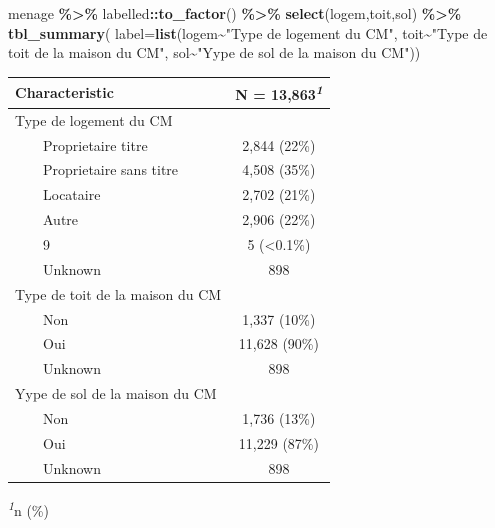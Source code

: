 \documentclass[
]{article}
\newenvironment{Shaded}{\begin{snugshade}}{\end{snugshade}}
\newcommand{\AttributeTok}[1]{\textcolor[rgb]{0.13,0.29,0.53}{#1}}
\newcommand{\FunctionTok}[1]{\textcolor[rgb]{0.13,0.29,0.53}{\textbf{#1}}}
\newcommand{\NormalTok}[1]{#1}
\newcommand{\SpecialCharTok}[1]{\textcolor[rgb]{0.81,0.36,0.00}{\textbf{#1}}}
\newcommand{\StringTok}[1]{\textcolor[rgb]{0.31,0.60,0.02}{#1}}
\begin{document}
\begin{Shaded}
\begin{Highlighting}[]
\NormalTok{menage }\SpecialCharTok{\%\textgreater{}\%}
\NormalTok{  labelled}\SpecialCharTok{::}\FunctionTok{to\_factor}\NormalTok{() }\SpecialCharTok{\%\textgreater{}\%}
  \FunctionTok{select}\NormalTok{(logem,toit,sol) }\SpecialCharTok{\%\textgreater{}\%}
  \FunctionTok{tbl\_summary}\NormalTok{(}
    \AttributeTok{label=}\FunctionTok{list}\NormalTok{(logem}\SpecialCharTok{\textasciitilde{}}\StringTok{"Type de logement du CM"}\NormalTok{,}
\NormalTok{               toit}\SpecialCharTok{\textasciitilde{}}\StringTok{"Type de toit de la maison du CM"}\NormalTok{,}
\NormalTok{               sol}\SpecialCharTok{\textasciitilde{}}\StringTok{"Yype de sol de la maison du CM"}\NormalTok{))}
\end{Highlighting}
\end{Shaded}

\begin{table}[!t]
\fontsize{12.0pt}{14.4pt}\selectfont
\begin{tabular*}{\linewidth}{@{\extracolsep{\fill}}lc}
\toprule
\textbf{Characteristic} & \textbf{N = 13,863}\textsuperscript{\textit{1}} \\ 
\midrule\addlinespace[2.5pt]
Type de logement du CM &  \\ 
    Proprietaire titre & 2,844 (22\%) \\ 
    Proprietaire sans titre & 4,508 (35\%) \\ 
    Locataire & 2,702 (21\%) \\ 
    Autre & 2,906 (22\%) \\ 
    9 & 5 (<0.1\%) \\ 
    Unknown & 898 \\ 
Type de toit de la maison du CM &  \\ 
    Non & 1,337 (10\%) \\ 
    Oui & 11,628 (90\%) \\ 
    Unknown & 898 \\ 
Yype de sol de la maison du CM &  \\ 
    Non & 1,736 (13\%) \\ 
    Oui & 11,229 (87\%) \\ 
    Unknown & 898 \\ 
\bottomrule
\end{tabular*}
\begin{minipage}{\linewidth}
\textsuperscript{\textit{1}}n (\%)\\
\end{minipage}
\end{table}
\end{document}
